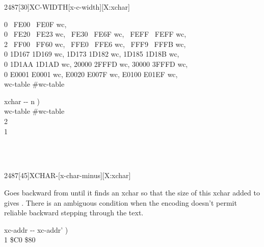 \begin{worddef}{2487}[30]{XC-WIDTH}[x-c-width][X:xchar]
\begin{implement}
	0 ~FE00 ~FE0F wc,\\
	0 ~FE20 ~FE23 wc, ~FE30 ~FE6F wc, ~FEFF ~FEFF wc,\\
	2 ~FF00 ~FF60 wc, ~FFE0 ~FFE6 wc, ~FFF9 ~FFFB wc,\\
	0 1D167 1D169 wc, 1D173 1D182 wc, 1D185 1D18B wc,\\
	0 1D1AA 1D1AD wc, 20000 2FFFD wc, 30000 3FFFD wc,\\
	0 E0001 E0001 wc, E0020 E007F wc, E0100 E01EF wc,\\
	 wc-table \word{-}  \#wc-table

	 

	\word{:}   xchar -{}- n ) \\
	\tab wc-table \#wc-table  \word{+}   \\
	\tab[2]     
		  2  \word{+}     \\
	    1 \word{;}
	\end{implement}

	\begin{testing}
		 \\
		 \\
	\end{testing}
\end{worddef}


\begin{worddef}{2487}[45]{XCHAR-}[x-char-minus][X:xchar]
\item {}

	Goes backward from  until it finds an xchar so that the
	size of this xchar added to  gives .
	There is an ambiguous condition when the encoding doesn't permit reliable
	backward stepping through the text.

	\begin{implement}
	\word{:}   xc-addr -{}- xc-addr' ) \\
	\tab {}  1  \word{-}   \$C0  \$80   \word{;}
	\end{implement}
\end{worddef}


